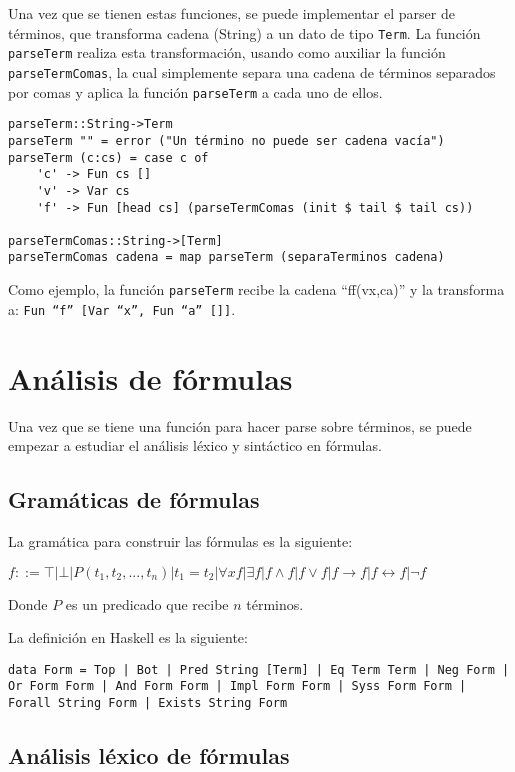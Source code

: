 \documentclass{article}
\begin{document}
Una vez que se tienen estas funciones, se puede implementar el parser de términos, que transforma cadena (String) a un dato de tipo \texttt{Term}. La función \texttt{parseTerm} realiza esta transformación, usando como auxiliar la función \texttt{parseTermComas}, la cual simplemente separa una cadena de términos separados por comas y aplica la función \texttt{parseTerm} a cada uno de ellos.

\begin{verbatim}
parseTerm::String->Term
parseTerm "" = error ("Un término no puede ser cadena vacía")
parseTerm (c:cs) = case c of
    'c' -> Fun cs []
    'v' -> Var cs
    'f' -> Fun [head cs] (parseTermComas (init $ tail $ tail cs))
    
parseTermComas::String->[Term]
parseTermComas cadena = map parseTerm (separaTerminos cadena)
\end{verbatim}

Como ejemplo, la función \texttt{parseTerm} recibe la cadena ``ff(vx,ca)'' y la transforma a: \texttt{Fun ``f'' [Var ``x'', Fun ``a'' []]}.

\section{Análisis de fórmulas}

Una vez que se tiene una función para hacer parse sobre términos, se puede empezar a estudiar el análisis léxico y sintáctico en fórmulas.

\subsection{Gramáticas de fórmulas}

La gramática para construir las fórmulas es la siguiente:

$f ::= \top | \bot | P (t_1, t_2, ..., t_n) | t_1=t_2 | \forall x f | \exists f | f \land f | f \lor f | f \rightarrow f | f \leftrightarrow f | \lnot f$

Donde $P$ es un predicado que recibe $n$ términos.

La definición en Haskell es la siguiente:

\texttt{data Form  = Top | Bot | Pred String [Term] | Eq Term Term | Neg Form | Or Form Form | And Form Form | Impl Form Form | Syss Form Form | Forall String Form | Exists String Form}

\subsection{Análisis léxico de fórmulas}
\end{document}
